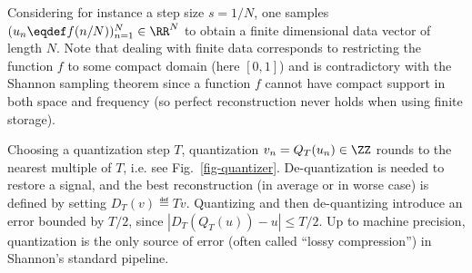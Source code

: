 Considering for instance a step size $s=1/N$, one samples $(u_n \eqdef f(n/N))_{n=1}^{N} \in \RR^N$ to obtain a finite dimensional data vector of length $N$. Note that dealing with finite data corresponds to restricting the function $f$ to some compact domain (here $[0,1]$) and is contradictory with the Shannon sampling theorem since a function $f$ cannot have compact support in both space and frequency (so perfect reconstruction never holds when using finite storage).


Choosing a quantization step $T$, quantization $v_n = Q_T(u_n) \in \ZZ$ rounds to the nearest multiple of $T$, i.e. 
see Fig.~\ref{fig-quantizer}. De-quantization is needed to restore a signal, and the best reconstruction (in average or in worse case) is defined by setting $D_T(v) \eqdef T v$. Quantizing and then de-quantizing introduce an error bounded by $T/2$, since $|D_T(Q_T(u))-u| \leq T/2$. 
%
Up to machine precision, quantization is the only source of error (often called ``lossy compression'') in Shannon's standard pipeline.






